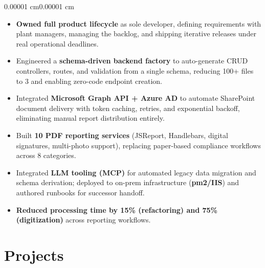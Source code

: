 \documentclass[10pt, letterpaper]{article}
\newenvironment{highlights}{
    \begin{itemize}[
        topsep=0.08 cm,
        parsep=0.06 cm,
        partopsep=0pt,
        itemsep=0pt,
        leftmargin=10pt
    ]
}{
    \end{itemize}
}
\newenvironment{onecolentry}{
    \begin{adjustwidth}{0.00001 cm}{0.00001 cm}
}{
    \end{adjustwidth}
}
\begin{document}
\vspace{0.08 cm}
\begin{onecolentry}
    \begin{highlights}
        \item \textbf{Owned full product lifecycle} as sole developer, defining requirements with plant managers, managing the backlog, and shipping iterative releases under real operational deadlines.
        \item Engineered a \textbf{schema-driven backend factory} to auto-generate CRUD controllers, routes, and validation from a single schema, reducing 100+ files to 3 and enabling zero-code endpoint creation.
        \item Integrated \textbf{Microsoft Graph API + Azure AD} to automate SharePoint document delivery with token caching, retries, and exponential backoff, eliminating manual report distribution entirely.
        \item Built \textbf{10 PDF reporting services} (JSReport, Handlebars, digital signatures, multi-photo support), replacing paper-based compliance workflows across 8 categories.
        \item Integrated \textbf{LLM tooling (MCP)} for automated legacy data migration and schema derivation; deployed to on-prem infrastructure (\textbf{pm2/IIS}) and authored runbooks for successor handoff.
        \item \textbf{Reduced processing time by 15\% (refactoring) and 75\% (digitization)} across reporting workflows.
    \end{highlights}
\end{onecolentry}

\section{Projects}
\end{document}

